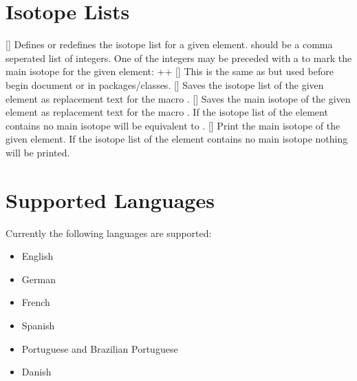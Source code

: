 \documentclass[load-preamble+]{cnltx-doc}
\begin{document}
\section{Isotope Lists}

\begin{commands}
  []
    Defines or redefines the isotope list for a given element.   should be a comma seperated list of integers.  One of the integers
    may be preceded with a \code{!} to mark the main isotope for the given
    element: \verbcode++
  []
    This is the same as  but used before begin document or
    in packages/classes.
  []
    Saves the isotope list of the given element as replacement text for the
    macro .
  []
    Saves the main isotope of the given element as replacement text for the
    macro .  If the isotope list of the element contains no main
    isotope  will be equivalent to .
  []
    Print the main isotope of the given element.  If the
    isotope list of the element contains no main isotope nothing will be
    printed.
\end{commands}

\begin{example}
  \ttfamily
  \saveelementisotopes{}
  \meaning\foo\par
  \savemainelementisotope{}
  \meaning\foo\par
  \normalfont
\end{example}

\clearpage

\section{Supported Languages}
Currently the following languages are supported:
\begin{itemize}
  \item English
  \item German
  \item French
  \item {}Spanish
  \item {}Portuguese and Brazilian Portuguese
  \item {}Danish
\end{itemize}
\end{document}
